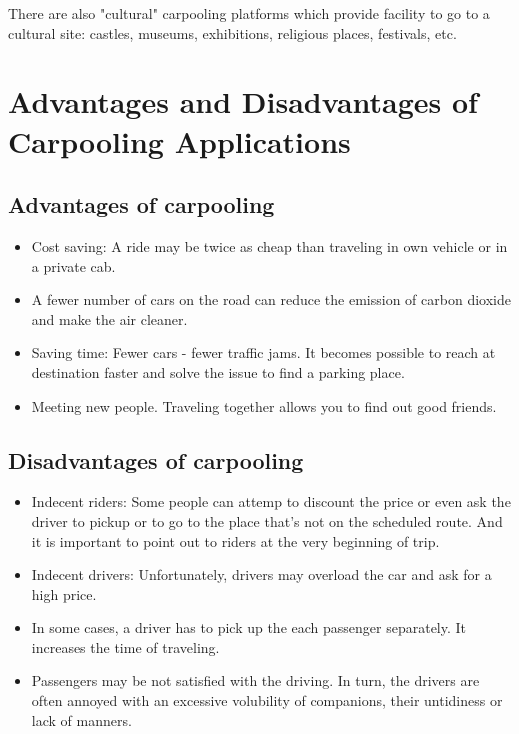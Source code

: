 There are also "cultural" carpooling platforms which provide facility to go to a cultural site: castles, museums, exhibitions, religious places, festivals, etc.

\section{Advantages and Disadvantages of Carpooling Applications}

\subsection{Advantages of carpooling}

\begin{itemize}
\item Cost saving: A ride may be twice as cheap than traveling in own vehicle or in a private cab.
\item A fewer number of cars on the road can reduce the emission of carbon dioxide and make the air cleaner. 
\item Saving time: Fewer cars - fewer traffic jams. It becomes possible to reach at destination faster and solve the issue to find a parking place.
\item Meeting new people. Traveling together allows you to find out good friends. 
\end{itemize}

\subsection{Disadvantages of carpooling}

\begin{itemize}
\item Indecent riders: Some people can attemp to discount the price or even ask the driver to pickup or to go to the place that's not on the scheduled route. And it is important to point out to  riders at the very beginning of trip.  
\item Indecent drivers: Unfortunately, drivers may overload the car and ask for a high price. 
\item In some cases, a driver has to pick up the each passenger separately. It increases the time of traveling.
\item Passengers may be not satisfied with the driving. In turn, the drivers are often annoyed with an excessive volubility of companions, their untidiness or lack of manners.
\end{itemize}